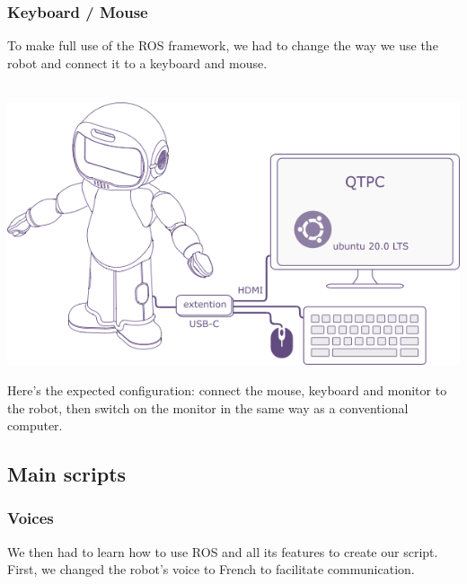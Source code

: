 \subsubsection{Keyboard / Mouse}
To make full use of the ROS framework, we had to change the way we use the robot and connect it to a keyboard and mouse.\\
\\
\begin{minipage}{.6\textwidth}%
\includegraphics[width=\textwidth]{Figures/qtsourissetup.png}
\end{minipage}%
\hfill
\begin{minipage}{.33\textwidth}%
Here's the expected configuration: connect the mouse, keyboard and monitor to the robot, then switch on the monitor in the same way as a conventional computer.\\
\end{minipage}%

\subsection{Main scripts}

\subsubsection{Voices}
We then had to learn how to use ROS and all its features to create our script. First, we changed the robot's voice to French to facilitate communication.

